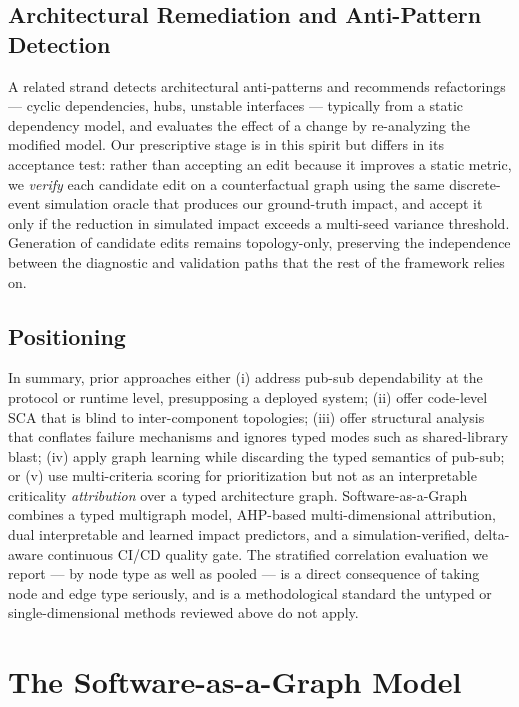 \documentclass[review]{elsarticle}
\begin{document}
\subsection{Architectural Remediation and Anti-Pattern Detection}

A related strand detects architectural anti-patterns and recommends refactorings --- cyclic
dependencies, hubs, unstable interfaces --- typically from a static dependency model, and evaluates
the effect of a change by re-analyzing the modified model. Our prescriptive stage is in this spirit
but differs in its acceptance test: rather than accepting an edit because it improves a static
metric, we \emph{verify} each candidate edit on a counterfactual graph using the same discrete-event
simulation oracle that produces our ground-truth impact, and accept it only if the reduction in
simulated impact exceeds a multi-seed variance threshold. Generation of candidate edits remains
topology-only, preserving the independence between the diagnostic and validation paths that the rest
of the framework relies on.

\subsection{Positioning}

In summary, prior approaches either (i) address pub-sub dependability at the protocol or runtime
level, presupposing a deployed system; (ii) offer code-level SCA that is blind to inter-component
topologies; (iii) offer structural analysis that conflates failure mechanisms and ignores typed
modes such as shared-library blast; (iv) apply graph learning while discarding the typed semantics
of pub-sub; or (v) use multi-criteria scoring for prioritization but not as an interpretable
criticality \emph{attribution} over a typed architecture graph. Software-as-a-Graph combines a typed
multigraph model, AHP-based multi-dimensional attribution, dual interpretable and learned impact
predictors, and a simulation-verified, delta-aware continuous CI/CD quality gate. The stratified
correlation evaluation we report --- by node type as well as pooled --- is a direct consequence of
taking node and edge type seriously, and is a methodological standard the untyped or
single-dimensional methods reviewed above do not apply.

\section{The Software-as-a-Graph Model}
\label{sec:model}
\end{document}
